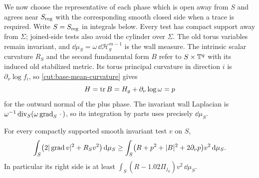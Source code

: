 We now choose the representative of each phase which is open away from
$S$ and agrees near $S_{\rm reg}$ with the corresponding smooth closed
side when a trace is required.  Write $S=S_{\rm reg}$ in integrals below.
Every test has compact support away from $\Sigma$; joined-side tests
also avoid the cylinder over $\Sigma$.  The old torus variables remain
invariant, and $\dd\mu_S=\omega\,\dd\mathcal H_g^{m-1}$ is the wall
measure.  The intrinsic scalar curvature $R_S$ and the second
fundamental form $B$ refer to $S\times\mathbb T^q$ with its induced old
stabilized metric.  Its torus principal curvature in direction $i$ is
$\partial_\nu\log f_i$, so \eqref{cut:base-mean-curvature} gives
\[
          H=\operatorname{tr} B=H_g+\partial_\nu\log\omega=p
\]
for the outward normal of the plus phase.  The invariant wall Laplacian
is $\omega^{-1}\operatorname{div}_S(\omega\operatorname{grad}_S\,\cdot\,)$, so its integration by
parts uses precisely $\dd\mu_S$.

\begin{lemma}\label{cut:wall-stability}
For every compactly supported smooth invariant test $v$ on $S$,
\begin{equation}\label{cut:wall-form}
 \int_S\bigl(2|\operatorname{grad} v|^2+R_Sv^2\bigr)\,\mathrm d\mu_S
 \ge\int_S\bigl(R+p^2+|B|^2+2\partial_\nu p\bigr)v^2\,\mathrm d\mu_S.
\end{equation}
In particular its right side is at least
$\int_S(R-1.02\Pi_{j_0})v^2\,\dd\mu_S$.
\end{lemma}

